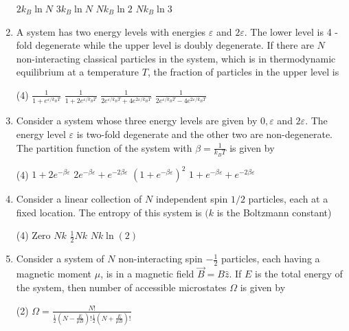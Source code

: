 \begin{enumerate}
\begin{tasks}
		\task[\textbf{A.}] $2 k_{B} \ln N$
		\task[\textbf{B.}] $3 k_{B} \ln N$
		\task[\textbf{C.}] $N k_{B} \ln 2$
		\task[\textbf{D.}] $N k_{B} \ln 3$
	\end{tasks}	
	\item A system has two energy levels with energies $\varepsilon$ and $2 \varepsilon .$ The lower level is 4 -fold degenerate while the upper level is doubly degenerate. If there are $N$ non-interacting classical particles in the system, which is in thermodynamic equilibrium at a temperature $T$, the fraction of particles in the upper level is
	{}
	\begin{tasks}(4)
		\task[\textbf{A.}] $\frac{1}{1+e^{\varepsilon / k_{B} T}}$
		\task[\textbf{B.}] $\frac{1}{1+2 e^{\varepsilon / k_{B} T}}$
		\task[\textbf{C.}] $\frac{1}{2 e^{\varepsilon / k_{B} T}+4 e^{2 \varepsilon / k_{B} T}}$
		\task[\textbf{D.}] $\frac{1}{2 e^{\varepsilon / k_{B} T}-4 e^{2 \varepsilon / k_{B} T}}$
	\end{tasks}
	\item Consider a system whose three energy levels are given by $0, \varepsilon$ and $2 \varepsilon$. The energy level $\varepsilon$ is two-fold degenerate and the other two are non-degenerate. The partition function of the system with $\beta=\frac{1}{k_{B} T}$ is given by
	{}
	\begin{tasks}(4)
		\task[\textbf{A.}] $1+2 e^{-\beta \varepsilon}$
		\task[\textbf{B.}] $2 e^{-\beta \varepsilon}+e^{-2 \beta \varepsilon}$
		\task[\textbf{C.}] $\left(1+e^{-\beta \varepsilon}\right)^{2}$
		\task[\textbf{D.}] $1+e^{-\beta \varepsilon}+e^{-2 \beta \varepsilon}$
	\end{tasks}
	\item Consider a linear collection of $N$ independent spin $1 / 2$ particles, each at a fixed location. The entropy of this system is $(k$ is the Boltzmann constant)
	{}
	\begin{tasks}(4)
		\task[\textbf{A.}] Zero
		\task[\textbf{B.}]  $N k$
		\task[\textbf{C.}]  $\frac{1}{2} N k$
		\task[\textbf{D.}] $N k \ln (2)$
	\end{tasks}	
	\item Consider a system of $N$ non-interacting spin $-\frac{1}{2}$ particles, each having a magnetic moment $\mu$, is in a magnetic field $\vec{B}=B \hat{z} .$ If $E$ is the total energy of the system, then number of accessible microstates $\Omega$ is given by
	{}
	\begin{tasks}(2)
		\task[\textbf{A.}] $\Omega=\frac{N !}{\frac{1}{2}\left(N-\frac{E}{\mu B}\right) ! \frac{1}{2}\left(N+\frac{E}{\mu B}\right) !}$

\end{tasks}
\end{enumerate}
